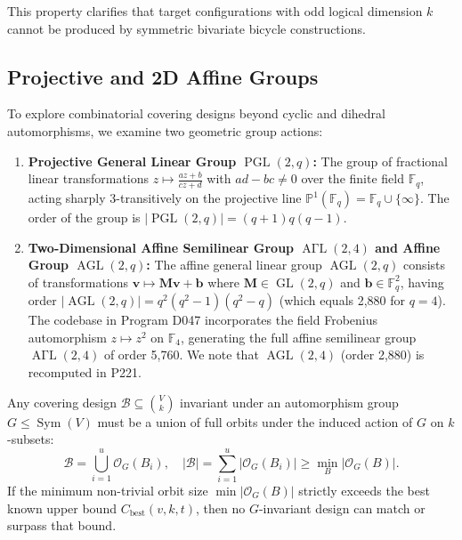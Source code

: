 \documentclass[11pt,a4paper]{article}
\begin{document}
This property clarifies that target configurations with odd logical dimension $k$ cannot be produced by symmetric bivariate bicycle constructions.

\subsection{Projective and 2D Affine Groups}
\label{sec:projective_groups}
To explore combinatorial covering designs beyond cyclic and dihedral automorphisms, we examine two geometric group actions:
\begin{enumerate}
    \item \textbf{Projective General Linear Group $\operatorname{PGL}(2, q)$:} The group of fractional linear transformations $z \mapsto \frac{az + b}{cz + d}$ with $ad - bc \ne 0$ over the finite field $\mathbb{F}_q$, acting sharply 3-transitively on the projective line $\mathbb{P}^1(\mathbb{F}_q) = \mathbb{F}_q \cup \{\infty\}$. The order of the group is $|\operatorname{PGL}(2, q)| = (q + 1) q (q - 1)$.
    \item \textbf{Two-Dimensional Affine Semilinear Group $\operatorname{A\Gamma L}(2, 4)$ and Affine Group $\operatorname{AGL}(2, q)$:} The affine general linear group $\operatorname{AGL}(2, q)$ consists of transformations $\mathbf{v} \mapsto \mathbf{M} \mathbf{v} + \mathbf{b}$ where $\mathbf{M} \in \operatorname{GL}(2, q)$ and $\mathbf{b} \in \mathbb{F}_q^2$, having order $|\operatorname{AGL}(2, q)| = q^2 (q^2 - 1)(q^2 - q)$ (which equals 2,880 for $q=4$). The codebase in Program D047 incorporates the field Frobenius automorphism $z \mapsto z^2$ on $\mathbb{F}_4$, generating the full affine semilinear group $\operatorname{A\Gamma L}(2, 4)$ of order 5,760. We note that $\operatorname{AGL}(2, 4)$ (order 2,880) is recomputed in P221.
\end{enumerate}

Any covering design $\mathcal{B} \subseteq \binom{V}{k}$ invariant under an automorphism group $G \le \operatorname{Sym}(V)$ must be a union of full orbits under the induced action of $G$ on $k$-subsets:
\begin{equation}
\mathcal{B} = \bigcup_{i=1}^u \mathcal{O}_G(B_i), \quad |\mathcal{B}| = \sum_{i=1}^u |\mathcal{O}_G(B_i)| \ge \min_{B} |\mathcal{O}_G(B)|.
\end{equation}
If the minimum non-trivial orbit size $\min |\mathcal{O}_G(B)|$ strictly exceeds the best known upper bound $C_{\text{best}}(v, k, t)$, then no $G$-invariant design can match or surpass that bound.
\end{document}
